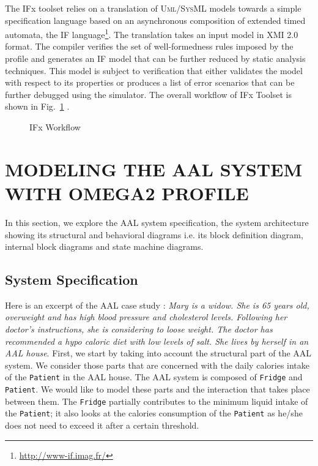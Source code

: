 \documentclass[a4paper,twoside]{article}
\def\sysml{\textsc{SysML}}
\def\uml{\textsc{Uml}}
\begin{document}
The IFx toolset relies on a translation of \uml{}/\sysml{} models towards a simple specification language based on an asynchronous composition of extended timed automata, the IF language\footnote{\url{http://www-if.imag.fr/}}. The translation takes an input model in XMI 2.0 format. 
The compiler verifies the set of well-formedness rules imposed by the profile and generates an IF model that can be further reduced by static analysis techniques. This model is subject to verification that either validates the model with respect to its properties or produces a list of error scenarios that can be further debugged using the simulator. The overall workflow  of IFx Toolset is shown in Fig.~\ref{fig:flow} \cite{test16}.

\begin{figure}[!htb]
  \centering
  {}
  \caption{IFx Workflow}
  \label{fig:flow}
\end{figure}
 


\section{\uppercase{Modeling the AAL system with OMEGA2 Profile}}
\label{sec:aal_model}
\noindent In this section, we explore the AAL system specification, the system architecture showing its structural and behavioral diagrams i.e. its block definition diagram, internal block diagrams and state machine diagrams.

\subsection{System Specification}
Here is an excerpt of the AAL case study \cite{test6}: \textit{Mary is a widow. She is 65 years old, overweight and has high blood pressure and cholesterol levels. Following her doctor’s instructions, she is considering to loose weight. The doctor has recommended a hypo caloric diet with low levels of salt. She lives by herself in an AAL house}.
First, we start by taking into account the structural part of the AAL system. We consider those parts that are concerned with the daily calories intake of the \texttt{Patient} in the AAL house. The AAL system is composed of \texttt{Fridge} and \texttt{Patient}. We would like to model these parts and the interaction that takes place between them. The \texttt{Fridge} partially contributes to the minimum liquid intake of the \texttt{Patient}; it also looks at the calories consumption of the \texttt{Patient} as he/she does not need to exceed it after a certain threshold. 
\end{document}
